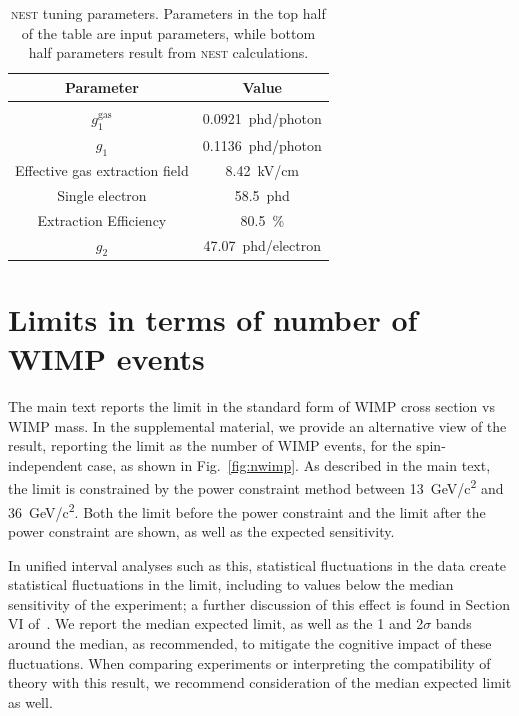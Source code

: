 \begin{table}[htbp]
    \caption{\textsc{nest} tuning parameters. Parameters in the top half of the table are input parameters, while bottom half parameters result from \textsc{nest} calculations.}
    \label{tab:NEST}
    \centering
    \begin{tabular}{cc}
    \\
    \hline
    \hline
    Parameter & Value \\
    \hline \\[-2.2ex]
    $g_1^{\text{gas}}$ & \SI{0.0921}{phd/photon}\\
        $g_1$ & \SI{0.1136}{phd/photon}\\
    Effective gas extraction field & \SI{8.42}{kV/cm} \\
    \hline
    \hline
    Single electron & \SI{58.5}{phd} \\
    Extraction Efficiency & \SI{80.5}{\percent}\\
    $g_2$ & \SI{47.07}{phd/electron}\\
    \hline
    \hline
    \end{tabular}

\end{table}

\section{Limits in terms of number of WIMP events}

The main text reports the limit in the standard form of WIMP cross section vs WIMP mass. In the supplemental material, we provide an alternative view of the result, reporting the limit as the number of WIMP events, for the spin-independent case, as shown in Fig.~\ref{fig:nwimp}.  As described in the main text, the limit is constrained by the power constraint method between \SI{13}{GeV/c\squared} and \SI{36}{GeV/c\squared}. Both the limit before the power constraint and the limit after the power constraint are shown, as well as the expected sensitivity. 

In unified interval analyses such as this, statistical fluctuations in the data create statistical fluctuations in the limit, including to values below the median sensitivity of the experiment; a further discussion of this effect is found in Section VI of~\cite{feldman1998unified}. We report the median expected limit, as well as the 1 and 2$\sigma$ bands around the median, as recommended, to mitigate the cognitive impact of these fluctuations. When comparing experiments or interpreting the compatibility of theory with this result, we recommend consideration of the median expected limit as well.

